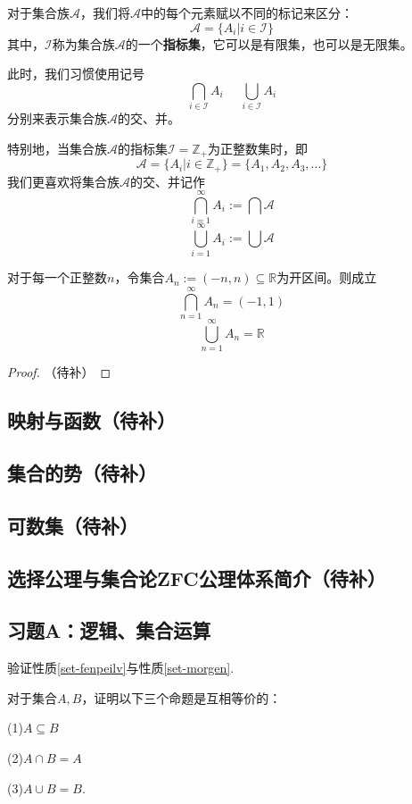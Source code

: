 对于集合族$\mathcal{A}$，我们将$\mathcal{A}$中的每个元素赋以不同的标记来区分：
$$\mathcal{A}=\{A_i|i\in\mathcal{I}\}$$
其中，$\mathcal{I}$称为集合族$\mathcal{A}$的一个\textbf{指标集}，它可以是有限集，也可以是无限集。

此时，我们习惯使用记号
$$\bigcap_{i\in\mathcal{I}}A_i\,\,\,\,\,\,\,\,\bigcup_{i\in\mathcal{I}}A_i$$
分别来表示集合族$\mathcal{A}$的交、并。

特别地，当集合族$\mathcal{A}$的指标集$\mathcal{I}=\mathbb{Z_+}$为正整数集时，即
$$\mathcal{A}=\{A_i|i\in\mathbb{Z}_+\}=\{A_1,A_2,A_3,...\}$$
我们更喜欢将集合族$\mathcal{A}$的交、并记作
$$\bigcap_{i=1}^{\infty}A_i:=\bigcap\mathcal{A}$$
$$\bigcup_{i=1}^{\infty}A_i:=\bigcup\mathcal{A}$$

\begin{example}
对于每一个正整数$n$，令集合$A_n:=(-n,n)\subseteq\mathbb{R}$为开区间。则成立
$$\bigcap_{n=1}^\infty A_n=(-1,1)$$
$$\bigcup_{n=1}^\infty A_n=\mathbb{R}$$
\end{example}
\begin{proof}
（待补）
\end{proof}

\subsection{映射与函数（待补）}
\subsection{集合的势（待补）}
\subsection{可数集（待补）}
\subsection{选择公理与集合论ZFC公理体系简介（待补）}
\subsection{习题A：逻辑、集合运算}

\begin{prob}验证性质\ref{set-fenpeilv}与性质\ref{set-morgen}.
\end{prob}\vs

\begin{prob}对于集合$A,B$，证明以下三个命题是互相等价的：

(1)$A\subseteq B$

(2)$A\cap B=A$

(3)$A\cup B=B$.
\end{prob}
\vs

